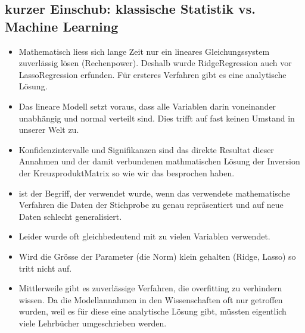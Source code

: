 \documentclass[letterpaper,10pt,english]{jupyterBook}
\begin{document}
\subsection{kurzer Einschub: klassische Statistik vs. Machine Learning}
\label{\detokenize{Regression_Techniques:kurzer-einschub-klassische-statistik-vs-machine-learning}}\begin{itemize}
\item {} 
\sphinxAtStartPar
Mathematisch liess sich lange Zeit nur ein lineares Gleichungssystem zuverlässig lösen (Rechenpower). Deshalb wurde Ridge\sphinxhyphen{}Regression auch vor Lasso\sphinxhyphen{}Regression erfunden. Für ersteres Verfahren gibt es eine analytische Lösung.

\item {} 
\sphinxAtStartPar
Das lineare Modell setzt voraus, dass alle Variablen darin voneinander unabhängig und normal verteilt sind. Dies trifft auf fast keinen Umstand in unserer Welt zu.

\item {} 
\sphinxAtStartPar
Konfidenzintervalle und Signifikanzen sind das direkte Resultat dieser Annahmen und der damit verbundenen mathmatischen Lösung \sphinxhyphen{} der Inversion der Kreuzprodukt\sphinxhyphen{}Matrix \sphinxhyphen{} so wie wir das besprochen haben.

\item {} 
\sphinxAtStartPar
{} ist der Begriff, der verwendet wurde, wenn das verwendete mathematische Verfahren die Daten der Stichprobe zu genau repräsentiert und auf neue Daten schlecht generalisiert.

\item {} 
\sphinxAtStartPar
Leider wurde  oft gleichbedeutend mit zu vielen Variablen verwendet.

\item {} 
\sphinxAtStartPar
Wird die Grösse der Parameter (die Norm) klein gehalten (Ridge, Lasso) so tritt  nicht auf.

\item {} 
\sphinxAtStartPar
Mittlerweile gibt es zuverlässige Verfahren, die overfitting zu verhindern wissen. Da die Modellannahmen in den Wissenschaften oft nur getroffen wurden, weil es für diese eine analytische Lösung gibt, müssten eigentlich viele Lehrbücher umgeschrieben werden.

\end{itemize}
\end{document}
